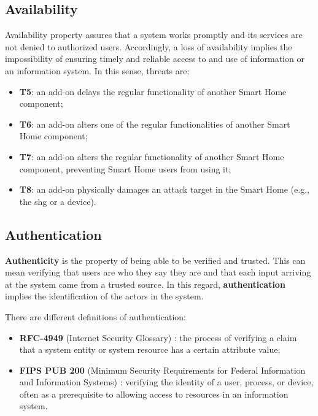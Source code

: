 \subsection{Availability}
\label{t5}\label{t6}\label{t7}\label{t8}
Availability property assures that a system works promptly and its services are not denied to authorized users. Accordingly, a loss of availability implies the impossibility of ensuring timely and reliable access to and use of information or an information system. In this sense, threats are:

\begin{itemize}
    \item \textbf{T5}: an add-on delays the regular functionality of another Smart Home component;
    \item \textbf{T6}: an add-on alters one of the regular functionalities of another Smart Home component;
    \item  \textbf{T7}: an add-on alters the regular functionality of another Smart Home component, preventing Smart Home users from using it;
    \item \textbf{T8}: an add-on physically damages an attack target in the Smart Home (e.g., the \gls{shg} or a device).
\end{itemize}



\subsection{Authentication}
\label{t9}

\textbf{Authenticity} is the property of being able to be verified and trusted. This can mean verifying that users are who they say they are and that each input arriving at the system came from a trusted source. In this regard, \textbf{authentication} implies the identification of the actors in the system. 

There are different definitions of authentication:
\begin{itemize}
    \item \textbf{RFC-4949} (Internet Security Glossary) \cite{rfc4949}: the process of verifying a claim that a system entity or system resource has a certain attribute value;

    
    \item \textbf{FIPS PUB 200} (Minimum Security Requirements for Federal Information and Information Systems) \cite{fipspub200}: verifying the identity of a user, process, or device, often as a prerequisite to allowing access to resources in an information system.
\end{itemize}
    

